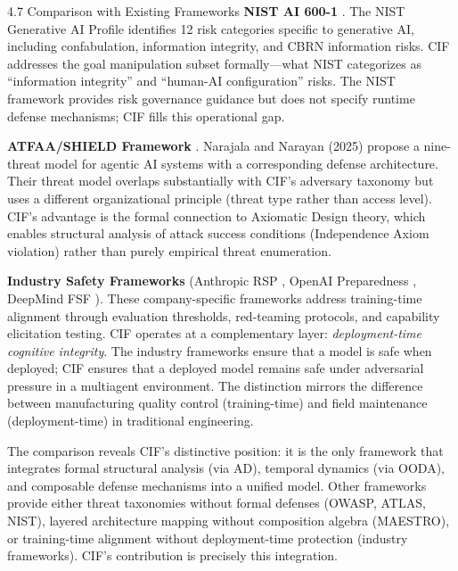 \documentclass[
  ignorenonframetext,
]{beamer}
\begin{document}
\begin{frame}[allowframebreaks]{4.7 Comparison with Existing Frameworks}
\textbf{NIST AI 600-1} \cite{nist2024genai}. The NIST Generative AI
Profile identifies 12 risk categories specific to generative AI,
including confabulation, information integrity, and CBRN information
risks. CIF addresses the goal manipulation subset formally---what NIST
categorizes as ``information integrity'' and ``human-AI configuration''
risks. The NIST framework provides risk governance guidance but does not
specify runtime defense mechanisms; CIF fills this operational gap.

\textbf{ATFAA/SHIELD Framework} \cite{narajala2025atfaa}. Narajala and
Narayan (2025) propose a nine-threat model for agentic AI systems with a
corresponding defense architecture. Their threat model overlaps
substantially with CIF's adversary taxonomy but uses a different
organizational principle (threat type rather than access level). CIF's
advantage is the formal connection to Axiomatic Design theory, which
enables structural analysis of attack success conditions (Independence
Axiom violation) rather than purely empirical threat enumeration.

\textbf{Industry Safety Frameworks} (Anthropic RSP
\cite{anthropic2024rsp}, OpenAI Preparedness
\cite{openai2025preparedness}, DeepMind FSF \cite{deepmind2025fsf}).
These company-specific frameworks address training-time alignment
through evaluation thresholds, red-teaming protocols, and capability
elicitation testing. CIF operates at a complementary layer:
\emph{deployment-time cognitive integrity}. The industry frameworks
ensure that a model is safe when deployed; CIF ensures that a deployed
model remains safe under adversarial pressure in a multiagent
environment. The distinction mirrors the difference between
manufacturing quality control (training-time) and field maintenance
(deployment-time) in traditional engineering.

The comparison reveals CIF's distinctive position: it is the only
framework that integrates formal structural analysis (via AD), temporal
dynamics (via OODA), and composable defense mechanisms into a unified
model. Other frameworks provide either threat taxonomies without formal
defenses (OWASP, ATLAS, NIST), layered architecture mapping without
composition algebra (MAESTRO), or training-time alignment without
deployment-time protection (industry frameworks). CIF's contribution is
precisely this integration.
\end{frame}
\end{document}
